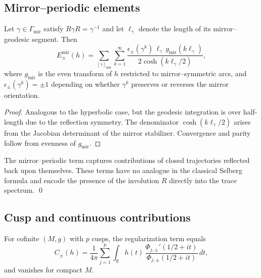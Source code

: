 
\subsection{Mirror–periodic elements}
\label{subsec:ch6-part5-mirror} \relax \hspace{0pt}
\begin{theorem}
\label{thm:mirror-term}
Let $\gamma\in\Gamma_{\mathrm{mir}}$ satisfy $R\gamma R=\gamma^{-1}$ and let $\ell_\gamma$ denote the length of its mirror–geodesic segment. Then
\[
E_\pm^{\mathrm{mir}}(h)
=\sum_{[\gamma]_{\mathrm{mir}}}\sum_{k=1}^\infty
\frac{\epsilon_\pm(\gamma^k)\,\ell_\gamma\,g_\mathrm{mir}(k\ell_\gamma)}{2\cosh(k\ell_\gamma/2)},
\]
where $g_\mathrm{mir}$ is the even transform of $h$ restricted to mirror–symmetric arcs, and $\epsilon_\pm(\gamma^k)=\pm1$ depending on whether $\gamma^k$ preserves or reverses the mirror orientation.  %
\end{theorem}

\begin{proof}
Analogous to the hyperbolic case, but the geodesic integration is over half-length due to the reflection symmetry. The denominator $\cosh(k\ell_\gamma/2)$ arises from the Jacobian determinant of the mirror stabilizer. Convergence and parity follow from evenness of $g_\mathrm{mir}$.  %
\end{proof}

\begin{remark}
\label{rem:mirror-meaning}
The mirror–periodic term captures contributions of closed trajectories reflected back upon themselves. These terms have no analogue in the classical Selberg formula and encode the presence of the involution $R$ directly into the trace spectrum. \qed {} %
\end{remark}


\subsection{Cusp and continuous contributions}
\label{subsec:ch6-part5-cusp} \relax \hspace{0pt}
\begin{proposition}
\label{prop:cusp-term}
For cofinite $(M,g)$ with $p$ cusps, the regularization term equals
\[
C_\pm(h)=\frac{1}{4\pi}\sum_{j=1}^{p}\int_{\mathbb R} h(t)\,\frac{\Phi_{j,\pm}'(1/2+it)}{\Phi_{j,\pm}(1/2+it)}\,dt,
\]
and vanishes for compact $M$.  %
\end{proposition}

